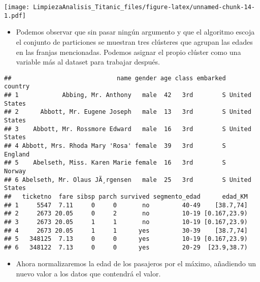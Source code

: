 \documentclass[
]{article}
\newenvironment{Shaded}{\begin{snugshade}}{\end{snugshade}}
\newcommand{\FunctionTok}[1]{\textcolor[rgb]{0.94,0.94,0.56}{#1}}
\newcommand{\NormalTok}[1]{\textcolor[rgb]{0.80,0.80,0.80}{#1}}
\newcommand{\OtherTok}[1]{\textcolor[rgb]{0.94,0.94,0.56}{#1}}
\newcommand{\SpecialCharTok}[1]{\textcolor[rgb]{0.86,0.64,0.64}{#1}}
\newcommand{\StringTok}[1]{\textcolor[rgb]{0.80,0.58,0.58}{#1}}
\providecommand{\tightlist}{%
  \setlength{\itemsep}{0pt}\setlength{\parskip}{0pt}}
\begin{document}
\texttt{[image: LimpiezaAnalisis\_Titanic\_files/figure-latex/unnamed-chunk-14-1.pdf]}

\begin{itemize}
\tightlist
\item
  Podemos observar que sin pasar ningún argumento y que el algoritmo
  escoja el conjunto de particiones se muestran tres clústeres que
  agrupan las edades en las franjas mencionadas. Podemos asignar el
  propio clúster como una variable más al dataset para trabajar después.
\end{itemize}

\begin{Shaded}
\end{Shaded}

\begin{verbatim}
##                             name gender age class embarked       country
## 1            Abbing, Mr. Anthony   male  42   3rd        S United States
## 2      Abbott, Mr. Eugene Joseph   male  13   3rd        S United States
## 3    Abbott, Mr. Rossmore Edward   male  16   3rd        S United States
## 4 Abbott, Mrs. Rhoda Mary 'Rosa' female  39   3rd        S       England
## 5    Abelseth, Miss. Karen Marie female  16   3rd        S        Norway
## 6 Abelseth, Mr. Olaus JÃ¸rgensen   male  25   3rd        S United States
##   ticketno  fare sibsp parch survived segmento_edad      edad_KM
## 1     5547  7.11     0     0       no         40-49    [38.7,74]
## 2     2673 20.05     0     2       no         10-19 [0.167,23.9)
## 3     2673 20.05     1     1       no         10-19 [0.167,23.9)
## 4     2673 20.05     1     1      yes         30-39    [38.7,74]
## 5   348125  7.13     0     0      yes         10-19 [0.167,23.9)
## 6   348122  7.13     0     0      yes         20-29  [23.9,38.7)
\end{verbatim}

\begin{itemize}
\tightlist
\item
  Ahora normalizaremos la edad de los pasajeros por el máximo, añadiendo
  un nuevo valor a los datos que contendrá el valor.
\end{itemize}
\end{document}
